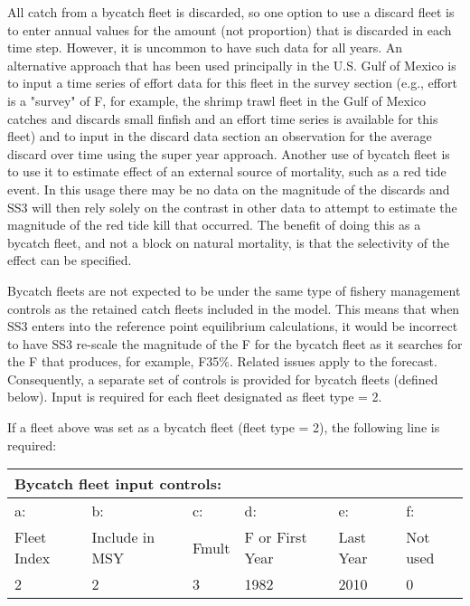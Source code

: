 All catch from a bycatch fleet is discarded, so one option to use a discard fleet is to enter annual values for the amount (not proportion) that is discarded in each time step.  However, it is uncommon to have such data for all years.  An alternative approach that has been used principally in the U.S. Gulf of Mexico is to input a time series of effort data for this fleet in the survey section (e.g.,  effort is a "survey" of F, for example, the shrimp trawl fleet in the Gulf of Mexico catches and discards small finfish and an effort time series is available for this fleet) and to input in the discard data section an observation for the average discard over time using the super year approach.  Another use of bycatch fleet is to use it to estimate effect of an external source of mortality, such as a red tide event.  In this usage there may be no data on the magnitude of the discards and SS3 will then rely solely on the contrast in other data to attempt to estimate the magnitude of the red tide kill that occurred. The benefit of doing this as a bycatch fleet, and not a block on natural mortality, is that the selectivity of the effect can be specified. 

Bycatch fleets are not expected to be under the same type of fishery management controls as the retained catch fleets included in the model.  This means that when SS3 enters into the reference point equilibrium calculations, it would be incorrect to have SS3 re-scale the magnitude of the F for the bycatch fleet as it searches for the F that produces, for example, F35\%.  Related issues apply to the forecast.  Consequently, a separate set of controls is provided for bycatch fleets (defined below).  Input is required for each fleet designated as fleet type = 2.

\noindent If a fleet above was set as a bycatch fleet (fleet type = 2), the following line is required: 
\begin{center}
	\begin{tabular}{p{2.25cm} p{2.65cm} p{2.25cm} p{2.5cm} p{2.5cm} p{2cm} }

		\multicolumn{6}{l}{Bycatch fleet input controls:}\\
		\hline
		a: 			   & b:  			  & c:    & d:     & e:    & f: \Tstrut\\
		 Fleet Index   & Include in MSY   & Fmult & F or First Year & Last Year & Not used \Bstrut\\			
		\hline
		2 & 2  & 3 & 1982 & 2010 & 0 \Tstrut\Bstrut\\
		\hline		
	\end{tabular}
\end{center}

